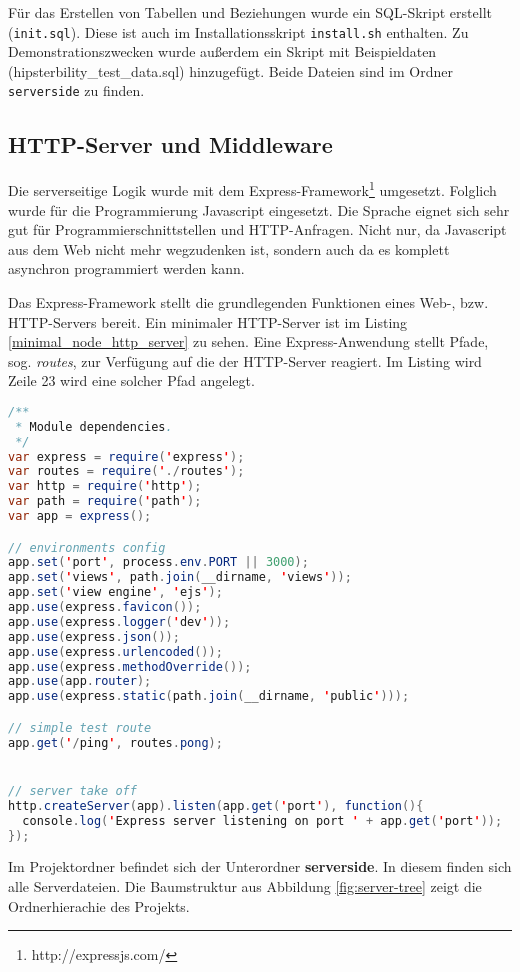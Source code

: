 Für das Erstellen von Tabellen und Beziehungen wurde ein \ac{SQL}-Skript erstellt (\texttt{init.sql}).
Diese ist auch im Installationsskript \texttt{install.sh} enthalten.
Zu Demonstrationszwecken wurde außerdem ein Skript mit Beispieldaten (hipsterbility\_test\_data.sql) hinzugefügt.
Beide Dateien sind im Ordner \texttt{serverside} zu finden.


\subsection{HTTP-Server und Middleware \label{sec:http-server-middleware}}
Die serverseitige Logik wurde mit dem Express-Framework\footnote{http://expressjs.com/} umgesetzt. 
Folglich wurde für die Programmierung Javascript eingesetzt. Die Sprache eignet sich sehr gut für Programmierschnittstellen und HTTP-Anfragen. 
Nicht nur, da Javascript aus dem Web nicht mehr wegzudenken ist, sondern auch da es komplett asynchron programmiert werden kann. 

Das Express-Framework stellt die grundlegenden Funktionen eines Web-, bzw. HTTP-Servers bereit.
Ein minimaler HTTP-Server ist im Listing \ref{minimal_node_http_server} zu sehen. 
Eine Express-Anwendung stellt Pfade, sog. \emph{routes}, zur Verfügung auf die der HTTP-Server reagiert. Im Listing wird Zeile 23 wird eine solcher Pfad angelegt. 

\pagebreak

\begin{lstlisting}[label=minimal_node_http_server,language=Java, caption=Minimaler Node-HTTP-Server]
/**
 * Module dependencies.
 */
var express = require('express');
var routes = require('./routes');
var http = require('http');
var path = require('path');
var app = express();

// environments config
app.set('port', process.env.PORT || 3000);
app.set('views', path.join(__dirname, 'views'));
app.set('view engine', 'ejs');
app.use(express.favicon());
app.use(express.logger('dev'));
app.use(express.json());
app.use(express.urlencoded());
app.use(express.methodOverride());
app.use(app.router);
app.use(express.static(path.join(__dirname, 'public')));

// simple test route
app.get('/ping', routes.pong);


// server take off
http.createServer(app).listen(app.get('port'), function(){
  console.log('Express server listening on port ' + app.get('port'));
});
\end{lstlisting}

Im Projektordner befindet sich der Unterordner \textbf{serverside}. In diesem finden sich alle Serverdateien. 
Die Baumstruktur aus Abbildung \ref{fig:server-tree} zeigt die Ordnerhierachie des Projekts.

